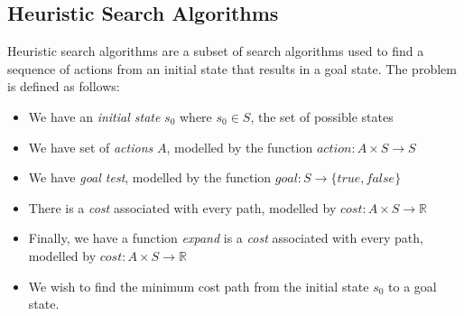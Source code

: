\documentclass[12pt,a4paper,twoside,openright]{report}
\theoremstyle{definition}
\begin{document}
\subsection{Heuristic Search Algorithms}
Heuristic search algorithms are a subset of search algorithms used to find a sequence of actions from an initial state that results in a goal state. The problem is defined as follows:
\begin{itemize}
  \item We have an \textit{initial state} $s_0$ where $s_0 \in S$, the set of possible states
  \item We have set of \textit{actions} $A$, modelled by the function $action: A\times S \to S$
  \item We have \textit{goal test}, modelled by the function $goal: S \to \{true, false\}$
  \item There is a \textit{cost} associated with every path, modelled by $cost: A \times S \to \mathbb{R}$
  \item Finally, we have a function \textit{expand} is a \textit{cost} associated with every path, modelled by $cost: A \times S \to \mathbb{R}$
  \item We wish to find the minimum cost path from the initial state $s_0$ to a goal state. 

\end{itemize}
\end{document}
